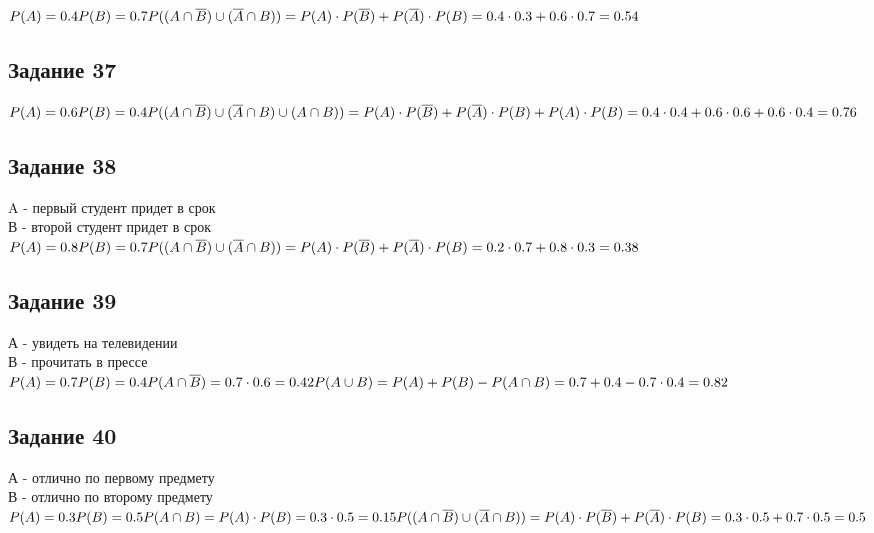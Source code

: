 \documentclass[12pt]{article}
\begin{document}
$
P(A)=0.4\\
P(B)=0.7\\
P((A\cap \overline B)\cup (\overline A \cap B))=
P(A)\cdot P(\overline B)+
P(\overline A)\cdot P(B)=
0.4\cdot 0.3+0.6\cdot 0.7=0.54
$

\newpage
\subsection{Задание 37}

$
P(A)=0.6\\
P(B)=0.4\\
P((A\cap \overline B)\cup 
(\overline A \cap B)\cup 
(A\cap B))=
P(A)\cdot P(\overline B)+
P(\overline A)\cdot P(B)+
P(A)\cdot P(B)=
0.4\cdot 0.4+0.6\cdot 0.6 + 0.6 \cdot 0.4=0.76
$

\newpage
\subsection{Задание 38}

A - первый студент придет в срок\\
В - второй студент придет в срок\\
$
P(A)=0.8\\
P(B)=0.7\\
P((A\cap \overline B)\cup 
(\overline A \cap B))=
P(A)\cdot P(\overline B)+
P(\overline A)\cdot P(B)=
0.2\cdot 0.7+0.8\cdot 0.3=0.38
$

\newpage
\subsection{Задание 39}

А - увидеть на телевидении\\
В - прочитать в прессе\\
$
P(A)=0.7\\
P(B)=0.4\\
P(A\cap \overline B)=
0.7\cdot 0.6=0.42\\
P(A\cup B)=P(A)+P(B)-P(A\cap B)=
0.7+0.4-0.7\cdot 0.4=0.82
$

\newpage
\subsection{Задание 40}

А - отлично по первому предмету\\
В - отлично по второму предмету\\
$
P(A)=0.3\\
P(B)=0.5\\
P(A\cap B)=P(A)\cdot P(B)=0.3\cdot 0.5=0.15\\
P((A\cap \overline B)\cup 
(\overline A \cap B))=
P(A)\cdot P(\overline B)+
P(\overline A)\cdot P(B)=
0.3\cdot 0.5+0.7\cdot 0.5=0.5
$
\end{document}
